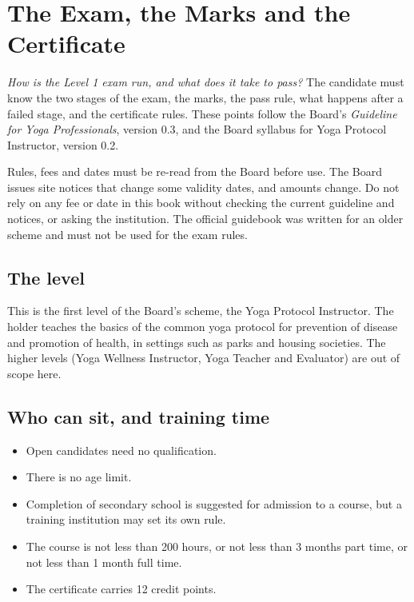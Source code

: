 \chapter{The Exam, the Marks and the Certificate}\label{ch:exam}

\emph{How is the Level 1 exam run, and what does it take to pass?}
The candidate must know the two stages of the exam, the marks, the pass rule, what happens after a failed stage, and the certificate rules. These points follow the Board's \emph{Guideline for Yoga Professionals}, version 0.3, and the Board syllabus for Yoga Protocol Instructor, version 0.2.

\begin{caution}
Rules, fees and dates must be re-read from the Board before use. The Board issues site notices that change some validity dates, and amounts change. Do not rely on any fee or date in this book without checking the current guideline and notices, or asking the institution. The official guidebook was written for an older scheme and must not be used for the exam rules.
\end{caution}

\section*{The level}

This is the first level of the Board's scheme, the Yoga Protocol Instructor. The holder teaches the basics of the common yoga protocol for prevention of disease and promotion of health, in settings such as parks and housing societies. The higher levels (Yoga Wellness Instructor, Yoga Teacher and Evaluator) are out of scope here.

\section*{Who can sit, and training time}

\begin{itemize}
\item Open candidates need no qualification.
\item There is no age limit.
\item Completion of secondary school is suggested for admission to a course, but a training institution may set its own rule.
\item The course is not less than 200 hours, or not less than 3 months part time, or not less than 1 month full time.
\item The certificate carries 12 credit points.
\end{itemize}


